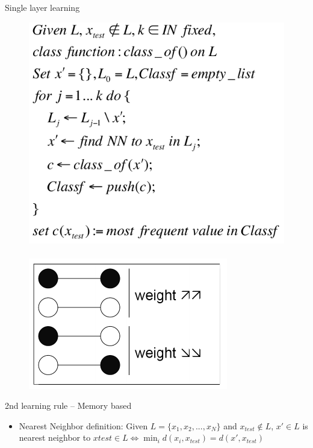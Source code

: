 \documentclass[9pt,t]{beamer}
\begin{document}
\begin{frame}{Single layer learning}
    \begin{figure}
        \centering
        \includegraphics[width=\linewidth]{knn_algorithm.png} \\\hfill\\
        \includegraphics[width=0.8\linewidth]{hebbs.png}
    \end{figure}
    \begin{alertblock}{2nd learning rule -- Memory based}
        \begin{itemize}
            \item Nearest Neighbor definition: Given $ L = \{x_1, x_2,...,x_N\} $ and $ x_{test} \notin L $, $ x' \in L $ is nearest neighbor to $ x{test} \in L \iff \min_i d(x_i, x_{test}) = d(x', x_{test}) $

\end{itemize}
\end{alertblock}
\end{frame}
\end{document}
